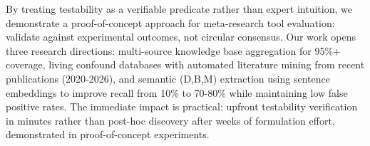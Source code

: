 By treating testability as a verifiable predicate rather than expert intuition, we demonstrate a proof-of-concept approach for meta-research tool evaluation: validate against experimental outcomes, not circular consensus. Our work opens three research directions: multi-source knowledge base aggregation for 95\%+ coverage, living confound databases with automated literature mining from recent publications (2020-2026), and semantic (D,B,M) extraction using sentence embeddings to improve recall from 10\% to 70-80\% while maintaining low false positive rates. The immediate impact is practical: upfront testability verification in minutes rather than post-hoc discovery after weeks of formulation effort, demonstrated in proof-of-concept experiments.
